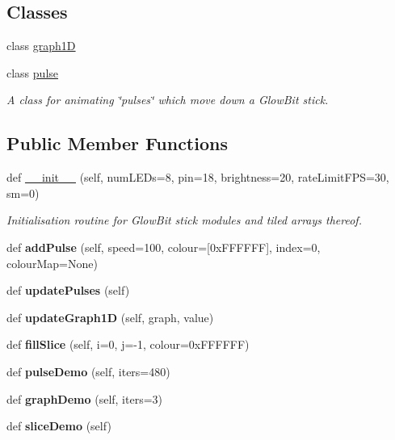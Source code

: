 \subsection*{Classes}
\begin{DoxyCompactItemize}
\item 
class \hyperlink{classglowbit_1_1stick_1_1graph1D}{graph1D}
\item 
class \hyperlink{classglowbit_1_1stick_1_1pulse}{pulse}
\begin{DoxyCompactList}\small\item\em A class for animating \char`\"{}pulses\char`\"{} which move down a Glow\+Bit stick. \end{DoxyCompactList}\end{DoxyCompactItemize}
\subsection*{Public Member Functions}
\begin{DoxyCompactItemize}
\item 
def \hyperlink{classglowbit_1_1stick_ac51b02c334481110558ac2f8c54938b8}{\+\_\+\+\_\+init\+\_\+\+\_\+} (self, num\+L\+E\+Ds=8, pin=18, brightness=20, rate\+Limit\+F\+PS=30, sm=0)
\begin{DoxyCompactList}\small\item\em Initialisation routine for Glow\+Bit stick modules and tiled arrays thereof. \end{DoxyCompactList}\item 
\mbox{\label{classglowbit_1_1stick_a14fb6c41aebc0b87595dde1ee4dd35a3}} 
def {\bfseries add\+Pulse} (self, speed=100, colour=\mbox{[}0x\+F\+F\+F\+F\+F\+F\mbox{]}, index=0, colour\+Map=\+None)
\item 
\mbox{\label{classglowbit_1_1stick_a84e72d81b9c96b1acb268b730866a8ea}} 
def {\bfseries update\+Pulses} (self)
\item 
\mbox{\label{classglowbit_1_1stick_acde1622da63c602b209a608384cb6020}} 
def {\bfseries update\+Graph1D} (self, graph, value)
\item 
\mbox{\label{classglowbit_1_1stick_a232b27f2f0e1c27787e6a584a05fc34c}} 
def {\bfseries fill\+Slice} (self, i=0, j=-\/1, colour=0x\+F\+F\+F\+F\+F\+F)
\item 
\mbox{\label{classglowbit_1_1stick_a06f96847a80f19e075de33b565dcd25d}} 
def {\bfseries pulse\+Demo} (self, iters=480)
\item 
\mbox{\label{classglowbit_1_1stick_a7f45fb8bf324841b710a215b1b2e3a1c}} 
def {\bfseries graph\+Demo} (self, iters=3)
\item 
\mbox{\label{classglowbit_1_1stick_a26eedb25d40d67d1e2ca786a7b8eb8b0}} 
def {\bfseries slice\+Demo} (self)
\end{DoxyCompactItemize}
